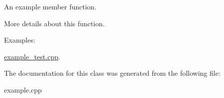 An example member function. 

More details about this function. \begin{Desc}
\item[Examples\+: ]\par
\hyperlink{example_test_8cpp-example}{example\+\_\+test.\+cpp}.\end{Desc}


The documentation for this class was generated from the following file\+:\begin{DoxyCompactItemize}
\item 
example.\+cpp\end{DoxyCompactItemize}
